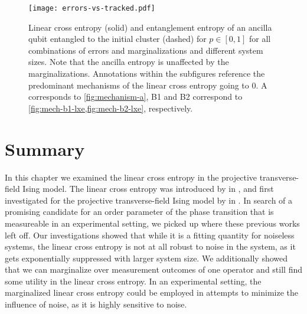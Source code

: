 %

\begin{figure}[p]
  \centering
  \texttt{[image: errors-vs-tracked.pdf]}
  \caption{Linear cross entropy (solid) and entanglement entropy of an ancilla qubit
  entangled to the initial cluster (dashed) for $p\in[0,1]$ for all combinations of
errors and marginalizations and different system sizes. Note that the ancilla entropy is unaffected by the
marginalizations. Annotations within the subfigures reference the predominant mechanisms of
the linear cross entropy going to $0$. \textsf{A} corresponds to
\cref{fig:mechanism-a}, \textsf{B1} and \textsf{B2} correspond to
\cref{fig:mech-b1-lxe,fig:mech-b2-lxe}, respectively.}
  \label{fig:err-vs-tra}
\end{figure}
\newpage
\section{Summary}
In this chapter we examined the linear cross entropy in the projective
transverse-field Ising model. The linear cross entropy was introduced by
\citeauthor{liCrossEntropyBenchmark2023} in \cite{liCrossEntropyBenchmark2023},
and first investigated for the projective transverse-field Ising model by
\citeauthor{tikhanovskayaUniversalityCrossEntropy2023} in
\cite{tikhanovskayaUniversalityCrossEntropy2023}. In search of a promising
candidate for an order parameter of the phase transition that is measureable in
an experimental setting, we picked up where these previous works left off. Our investigations
showed that while it is a fitting quantity for noiseless systems, the linear
cross entropy is not at all robust to noise in the system, as it gets exponentially
suppressed with larger system size. We additionally showed that we can
marginalize over measurement outcomes of one operator and still find some
utility in the linear cross entropy. In an experimental setting, the
marginalized linear cross entropy could be employed in attempts to minimize the
influence of noise, as it is highly sensitive to noise.
